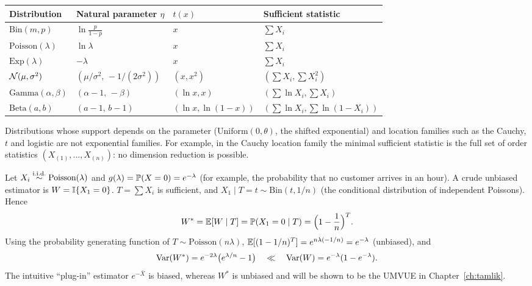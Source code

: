 \documentclass[main.tex]{subfiles}
\begin{document}
\begin{example}
\begin{center}
\begin{tabular}{@{}llll@{}}
\toprule
Distribution & Natural parameter $\eta$ & $t(x)$ & Sufficient statistic \\
\midrule
$\text{Bin}(m,p)$ & $\ln\frac{p}{1-p}$ & $x$ & $\sum X_i$ \\
$\text{Poisson}(\lambda)$ & $\ln\lambda$ & $x$ & $\sum X_i$ \\
$\text{Exp}(\lambda)$ & $-\lambda$ & $x$ & $\sum X_i$ \\
$\Normal(\mu,\sigma^2)$ & $(\mu/\sigma^2,\,-1/(2\sigma^2))$ & $(x,x^2)$ & $(\sum X_i,\sum X_i^2)$ \\
$\text{Gamma}(\alpha,\beta)$ & $(\alpha-1,\,-\beta)$ & $(\ln x,x)$ & $(\sum\ln X_i,\sum X_i)$ \\
$\text{Beta}(a,b)$ & $(a-1,\,b-1)$ & $(\ln x,\ln(1-x))$ & $(\sum\ln X_i,\sum\ln(1-X_i))$ \\
\bottomrule
\end{tabular}
\end{center}
Distributions whose support depends on the parameter ($\text{Uniform}(0,\theta)$, the shifted exponential) and location families such as the Cauchy, $t$ and logistic are not exponential families. For example, in the Cauchy location family the minimal sufficient statistic is the full set of order statistics $(X_{(1)},\dots,X_{(n)})$: no dimension reduction is possible.
\end{example}

\begin{example}\label{ex:poisson-rb}
Let $X_i\iid\text{Poisson}(\lambda)$ and $g(\lambda)=\P(X=0)=e^{-\lambda}$ (for example, the probability that no customer arrives in an hour). A crude unbiased estimator is $W=\I\{X_1=0\}$. $T=\sum X_i$ is sufficient, and $X_1\mid T=t\sim\text{Bin}(t,1/n)$ (the conditional distribution of independent Poissons). Hence
\[
W^*=\E[W\mid T]=\P(X_1=0\mid T)=\Big(1-\frac1n\Big)^{T}.
\]
Using the probability generating function of $T\sim\text{Poisson}(n\lambda)$, $\E[(1-1/n)^T]=e^{n\lambda(-1/n)}=e^{-\lambda}$ (unbiased), and
\[
\Var(W^*)=e^{-2\lambda}\big(e^{\lambda/n}-1\big)\quad\ll\quad\Var(W)=e^{-\lambda}(1-e^{-\lambda}).
\]
The intuitive ``plug-in'' estimator $e^{-\bar X}$ is biased, whereas $W^*$ is unbiased and will be shown to be the UMVUE in Chapter~\ref{ch:tamlik}.
\end{example}
\end{document}
